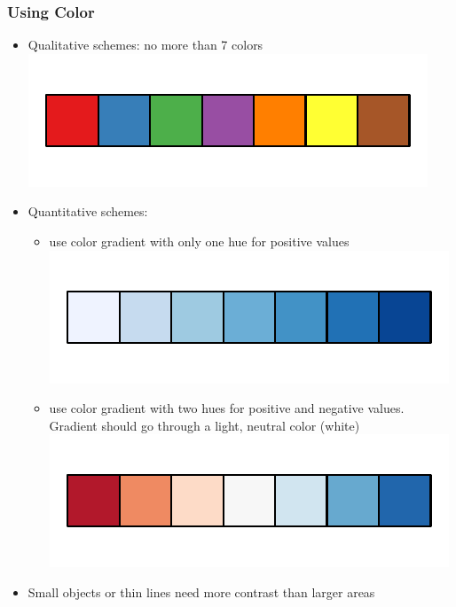 \documentclass{beamer}\usepackage[]{graphicx}\usepackage[]{color}
\begin{document}
\begin{frame}
\frametitle{Using Color}
\begin{itemize}
\item Qualitative schemes: no more than 7 colors\\
\includegraphics[width=.3\linewidth]{figure/gradients1}
\item Quantitative schemes: 
\begin{itemize}\item use color gradient with only one hue for positive values
\includegraphics[width=.3\linewidth]{figure/gradients2}
\item use color gradient with two hues for positive and negative values. Gradient should go through a light, neutral color (white)\\
\includegraphics[width=.3\linewidth]{figure/gradients3}
\end{itemize}
\item Small objects or thin lines need more contrast than larger areas
\end{itemize}
\end{frame}
\end{document}

